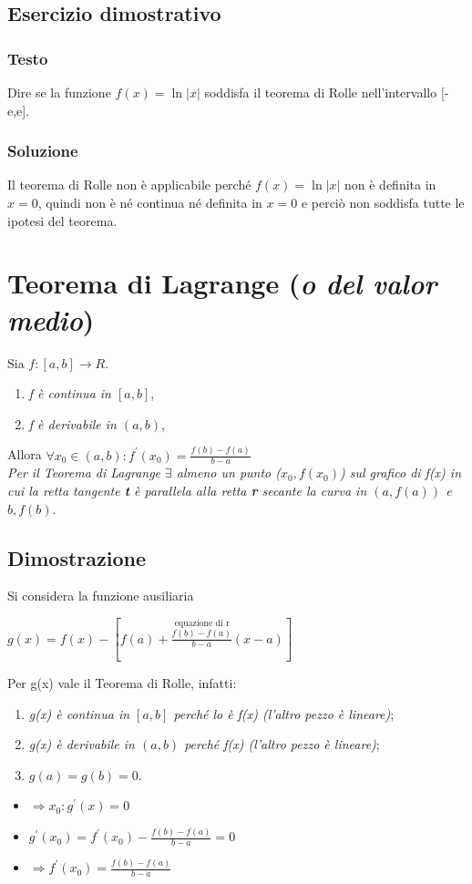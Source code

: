 \subsection{Esercizio dimostrativo}
\subsubsection{Testo}
Dire se la funzione $f(x)=\ln|x|$ soddisfa il teorema di Rolle nell'intervallo
[-e,e].
\subsubsection{Soluzione}
Il teorema di Rolle non è applicabile perché $f(x)=\ln|x|$ non è definita in
$x=0$, quindi non è né continua né definita in $x=0$ e perciò non soddisfa
tutte le ipotesi del teorema.
\section{Teorema di Lagrange ({\em o del valor medio})}
Sia $f:[a,b]\to R$.
\begin{enumerate}
	\item \textit{f è continua in $[a,b]$},
	\item \textit{f è derivabile in $(a,b)$},
\end{enumerate}
Allora $\forall x_0\in(a,b):f^\prime (x_0)=\frac{f(b)-f(a)}{b-a}$\\
\textit{Per il Teorema di Lagrange $\exists$ almeno un punto ($x_0,f(x_0)$) sul
grafico di f(x) in cui la retta tangente \textbf{t} è parallela alla retta
\textbf{r} secante la curva in $(a,f(a))$ e $b,f(b)$}.
\subsection{Dimostrazione}
Si considera la funzione ausiliaria 
\begin{center}
	$g(x)=f(x)-[\overset{\text{equazione di
	r}}{f(a)+\frac{f(b)-f(a)}{b-a}(x-a)}]$
\end{center}
Per g(x) vale il Teorema di Rolle, infatti:
\begin{enumerate}
	\item \textit{g(x) è continua in $[a,b]$ perché lo è f(x) (l'altro pezzo è
		lineare)};
	\item \textit{g(x) è derivabile in $(a,b)$ perché f(x) (l'altro pezzo è
		lineare)};
	\item $g(a)=g(b)=0$.
\end{enumerate}
\begin{itemize}
	\item $\Rightarrow x_0:g^\prime (x)=0$
	\item $g^\prime (x_0)=f^\prime(x_0)-\frac{f(b)-f(a)}{b-a}=0$
	\item $\Rightarrow f^\prime(x_0)=\frac{f(b)-f(a)}{b-a}$
\end{itemize}
